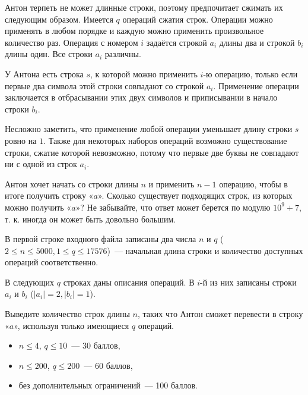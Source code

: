 
\Legend

Антон терпеть не может длинные строки, поэтому предпочитает сжимать их следующим образом. Имеется $q$ операций сжатия строк. Операции можно применять в любом порядке и каждую можно применить произвольное количество раз. Операция с номером $i$ задаётся строкой $a_i$ длины два и строкой $b_i$ длины один. Все строки $a_i$ различны.

У Антона есть строка $s$, к которой можно применить $i$-ю операцию, только если первые два символа этой строки совпадают со строкой $a_i$. Применение операции заключается в отбрасывании этих двух символов и приписывании в начало строки $b_i$.

Несложно заметить, что применение любой операции уменьшает длину строки $s$ ровно на $1$. Также для некоторых наборов операций возможно существование строки, сжатие которой невозможно, потому что первые две буквы не совпадают ни с одной из строк $a_i$.

Антон хочет начать со строки длины $n$ и применить $n - 1$ операцию, чтобы в итоге получить строку «$a$». Сколько существует подходящих строк, из которых можно получить «$a$»? Не забывайте, что ответ может берется по модулю $10^9 + 7$, т. к. иногда он может быть довольно большим.

\Input
В первой строке входного файла записаны два числа $n$ и $q$ ($2 \le n \le 5000, 1 \le q \le 17576$)~--- начальная длина строки и количество доступных операций соответственно.

В следующих $q$ строках даны описания операций. В $i$-й из них записаны строки $a_i$ и $b_i$ ($|a_i| = 2, |b_i| = 1$).

\Output
Выведите количество строк длины $n$, таких что Антон сможет перевести в строку «$a$», используя только имеющиеся $q$ операций.

\Samples
\BeginTests
\EndTests

\Scoring
\begin{itemize}
	\item $n \le 4$, $q \le 10$~--- 30 баллов,
	\item $n \le 200$, $q \le 200$~--- 60 баллов,
	\item без дополнительных ограничений~--- 100 баллов.
\end{itemize}

\EndProblem

